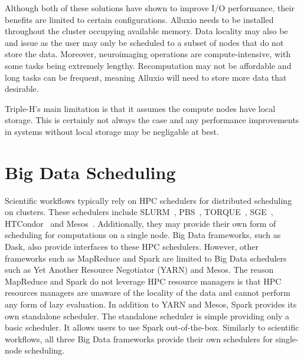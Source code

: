 \documentclass{report}
\begin{document}
                Although both of these solutions have shown to improve I/O
                performance, their benefits are limited to certain 
                configurations. Alluxio needs to be installed throughout the 
                cluster occupying available memory. Data locality may also be
                and issue as the user may only be scheduled to a subset of
                nodes that do not store the data. Moreover, neuroimaging 
                operations are compute-intensive, with some tasks being 
                extremely lengthy. Recomputation may not be affordable and long
                tasks can be frequent, meaning Alluxio will need to store more 
                data that desirable.

                Triple-H's main limitation is that it assumes the compute nodes
                have local storage. This is certainly not always the case and
                any performance improvements in systems without local storage 
                may be negligable at best.   
            
        \section{Big Data Scheduling}\label{sched}
            
            Scientific workflows typically rely on HPC schedulers for 
            distributed scheduling on clusters. These schedulers include 
            SLURM~\cite{yoo2003slurm},
            PBS~\cite{10.1007/3-540-60153-8_34}, 
            TORQUE~\cite{computing2015torque}, 
            SGE~\cite{SGE}, HTCondor~\cite{htcondor} and 
            Mesos~\cite{hindman2011mesos}. Additionally, they may provide
            their own form of scheduling for computations on a single node. 
            Big Data frameworks, such as Dask,
            also provide interfaces to these HPC schedulers. However, other
            frameworks such as MapReduce and Spark are limited to Big Data 
            schedulers such as Yet Another Resource Negotiator (YARN) and Mesos.
            The reason MapReduce and Spark do not leverage HPC resource managers
            is that HPC resources managers are unaware of the locality of the 
            data and cannot perform any form of lazy evaluation.
            In addition to YARN and Mesos, Spark provides its own standalone 
            scheduler. The standalone scheduler is simple providing only a 
            basic scheduler. It allows users to use Spark out-of-the-box. Similarly
            to scientific workflows, all three Big Data frameworks provide their
            own schedulers for single-node scheduling.
\end{document}
